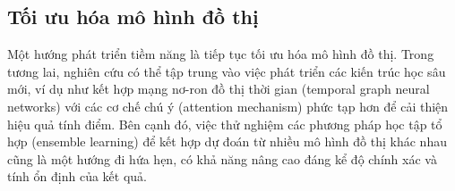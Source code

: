 \subsection{Tối ưu hóa mô hình đồ thị}
Một hướng phát triển tiềm năng là tiếp tục tối ưu hóa mô hình đồ thị. Trong tương lai, nghiên cứu có thể tập trung vào việc phát triển các kiến trúc học sâu mới, ví dụ như kết hợp mạng nơ-ron đồ thị thời gian (temporal graph neural networks) với các cơ chế chú ý (attention mechanism) phức tạp hơn để cải thiện hiệu quả tính điểm. Bên cạnh đó, việc thử nghiệm các phương pháp học tập tổ hợp (ensemble learning) để kết hợp dự đoán từ nhiều mô hình đồ thị khác nhau cũng là một hướng đi hứa hẹn, có khả năng nâng cao đáng kể độ chính xác và tính ổn định của kết quả.

